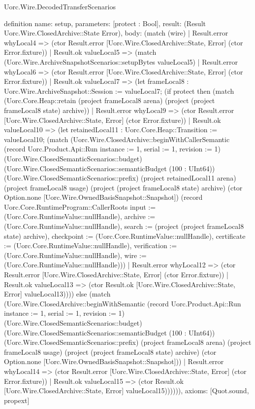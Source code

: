 \begin{lexlean}{Uorc.Wire.DecodedTransferScenarios}
\begin{semanticmodule}
definition{
  name: setup,
  parameters: [protect : Bool],
  result: (Result Uorc.Wire.ClosedArchive::State Error),
  body: (match (wire)
    | Result.error whyLocal4 => (ctor Result.error [Uorc.Wire.ClosedArchive::State, Error] (ctor Error.fixture))
    | Result.ok valueLocal5 => (match (Uorc.Wire.ArchiveSnapshotScenarios::setupBytes valueLocal5)
      | Result.error whyLocal6 => (ctor Result.error [Uorc.Wire.ClosedArchive::State, Error] (ctor Error.fixture))
      | Result.ok valueLocal7 => (let frameLocal8 : Uorc.Wire.ArchiveSnapshot::Session := valueLocal7; (if protect then (match (Uorc.Core.Heap::retain (project frameLocal8 arena) (project (project frameLocal8 state) archive))
        | Result.error whyLocal9 => (ctor Result.error [Uorc.Wire.ClosedArchive::State, Error] (ctor Error.fixture))
        | Result.ok valueLocal10 => (let retainedLocal11 : Uorc.Core.Heap::Transition := valueLocal10; (match (Uorc.Wire.ClosedArchive::beginWithCallerSemantic (record Uorc.Product.Api::Run {instance := 1, serial := 1, revision := 1}) (Uorc.Wire.ClosedSemanticScenarios::budget) (Uorc.Wire.ClosedSemanticScenarios::semanticBudget (100 : UInt64)) (Uorc.Wire.ClosedSemanticScenarios::prefix) (project retainedLocal11 arena) (project frameLocal8 usage) (project (project frameLocal8 state) archive) (ctor Option.none [Uorc.Wire.OwnedBasisSnapshot::Snapshot]) (record Uorc.Core.RuntimeProgram::CallerRoots {input := (Uorc.Core.RuntimeValue::nullHandle), archive := (Uorc.Core.RuntimeValue::nullHandle), search := (project (project frameLocal8 state) archive), checkpoint := (Uorc.Core.RuntimeValue::nullHandle), certificate := (Uorc.Core.RuntimeValue::nullHandle), verification := (Uorc.Core.RuntimeValue::nullHandle), wire := (Uorc.Core.RuntimeValue::nullHandle)}))
          | Result.error whyLocal12 => (ctor Result.error [Uorc.Wire.ClosedArchive::State, Error] (ctor Error.fixture))
          | Result.ok valueLocal13 => (ctor Result.ok [Uorc.Wire.ClosedArchive::State, Error] valueLocal13)))) else (match (Uorc.Wire.ClosedArchive::beginWithSemantic (record Uorc.Product.Api::Run {instance := 1, serial := 1, revision := 1}) (Uorc.Wire.ClosedSemanticScenarios::budget) (Uorc.Wire.ClosedSemanticScenarios::semanticBudget (100 : UInt64)) (Uorc.Wire.ClosedSemanticScenarios::prefix) (project frameLocal8 arena) (project frameLocal8 usage) (project (project frameLocal8 state) archive) (ctor Option.none [Uorc.Wire.OwnedBasisSnapshot::Snapshot]))
        | Result.error whyLocal14 => (ctor Result.error [Uorc.Wire.ClosedArchive::State, Error] (ctor Error.fixture))
        | Result.ok valueLocal15 => (ctor Result.ok [Uorc.Wire.ClosedArchive::State, Error] valueLocal15)))))),
  axioms: [Quot.sound, propext]
}


\end{semanticmodule}
\end{lexlean}
